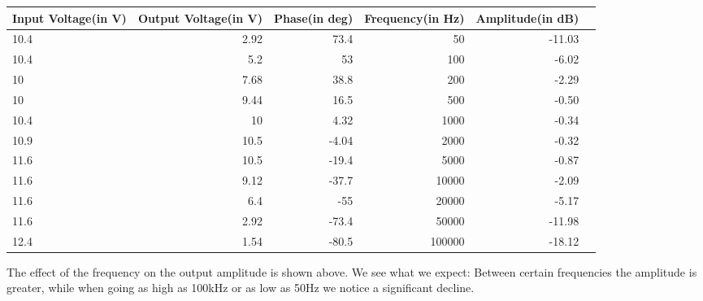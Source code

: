 \begin{adjustwidth}{-2.5 cm}{-2.5 cm}\centering\begin{threeparttable}[!htb]
        \scriptsize
        \begin{tabular}{lrrrrr}\toprule
            \textbf{Input Voltage(in V)} & \textbf{Output Voltage(in V)} & \textbf{Phase(in deg)} & \textbf{Frequency(in Hz)} & \textbf{Amplitude(in dB)} \\\midrule
            10.4                         & 2.92                          & 73.4                   & 50                        & -11.03                    \\
            10.4                         & 5.2                           & 53                     & 100                       & -6.02                     \\
            10                           & 7.68                          & 38.8                   & 200                       & -2.29                     \\
            10                           & 9.44                          & 16.5                   & 500                       & -0.50                     \\
            10.4                         & 10                            & 4.32                   & 1000                      & -0.34                     \\
            10.9                         & 10.5                          & -4.04                  & 2000                      & -0.32                     \\
            11.6                         & 10.5                          & -19.4                  & 5000                      & -0.87                     \\
            11.6                         & 9.12                          & -37.7                  & 10000                     & -2.09                     \\
            11.6                         & 6.4                           & -55                    & 20000                     & -5.17                     \\
            11.6                         & 2.92                          & -73.4                  & 50000                     & -11.98                    \\
            12.4                         & 1.54                          & -80.5                  & 100000                    & -18.12                    \\
            \bottomrule
        \end{tabular}
        \caption{The effect of the frequency on the output amplitude is shown above. We see what we expect: Between certain frequencies the amplitude is greater, while when going as high as 100kHz or as low as 50Hz we notice a significant decline.}
    \end{threeparttable}\end{adjustwidth}
